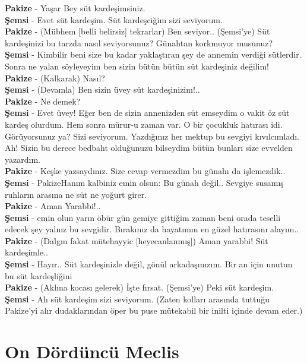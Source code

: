 \documentclass[]{book}
\begin{document}
\textbf{Pakize} - Yaşar Bey süt kardeşimsiniz.\\
\textbf{Şemsi} - Evet süt kardeşim. Süt kardeşciğim sizi seviyorum.\\
\textbf{Pakize} - (Mübhem {[}belli belirsiz{]} tekrarlar) Ben seviyor.. (Şemsi'ye) Süt kardeşinizi bu tarzda nasıl seviyorsunuz? Günahtan korkmuyor musunuz?\\
\textbf{Şemsi} - Kimbilir beni size bu kadar yaklaştıran şey de annemin verdiği sütlerdir. Sonra ne yalan söyleyeyim ben sizin bütün bütün süt kardeşiniz değilim!\\
\textbf{Pakize} - (Kalkarak) Nasıl?\\
\textbf{Şemsi} - (Devamla) Ben sizin üvey süt kardeşinizim!..\\
\textbf{Pakize} - Ne demek?\\
\textbf{Şemsi} - Evet üvey! Eğer ben de sizin annenizden süt emseydim o vakit öz süt kardeş olurdum. Hem sonra mürur-u zaman var. O bir çocukluk hatırası idi. Görüyorsunuz ya? Sizi seviyorum. Yazdığınız her mektup bu sevgiyi kıvılcımladı. Ah! Sizin bu derece bedbaht olduğunuzu bilseydim bütün bunları size evvelden yazardım.\\
\textbf{Pakize} - Keşke yazsaydınız. Size cevap vermezdim bu günahı da işlemezdik..\\
\textbf{Şemsi} - PakizeHanım kalbiniz emin olsun: Bu günah değil.. Sevgiye susamış ruhların arasına ne süt ne yoğurt girer.\\
\textbf{Pakize} - Aman Yarabbi!..\\
\textbf{Şemsi} - emin olun yarın öbür gün gemiye gittiğim zaman beni orada teselli edecek şey yalnız bu sevgidir. Bırakınız da hayatımın en güzel hatırasını alayım..\\
\textbf{Pakize} - (Dalgın fakat mütehayyic {[}heyecanlanmış{]}) Aman yarabbi! Süt kardeşimle..\\
\textbf{Şemsi} - Hayır.. Süt kardeşinizle değil, gönül arkadaşınızım. Bir an için unutun bu süt kardeşliğini\\
\textbf{Pakize} - (Aklına kocası gelerek) İşte fırsat. (Şemsi'ye) Peki süt kardeşim.\\
\textbf{Şemsi} - Ah süt kardeşim sizi seviyorum. (Zaten kolları arasında tuttuğu Pakize'yi alır dudaklarından öper bu puse mütekabil bir inilti içinde devam eder.)\\

\hypertarget{on-dorduncu-meclis}{%
\section{On Dördüncü Meclis}\label{on-dorduncu-meclis}}
\end{document}
